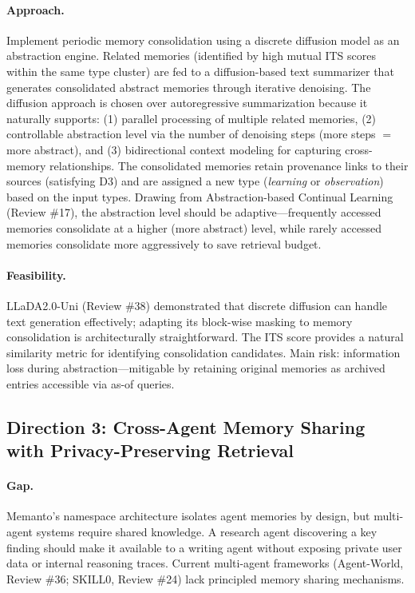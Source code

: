 \documentclass[11pt]{article}
\begin{document}
\paragraph{Approach.}
Implement periodic memory consolidation using a discrete diffusion model as an abstraction engine. Related memories (identified by high mutual ITS scores within the same type cluster) are fed to a diffusion-based text summarizer that generates consolidated abstract memories through iterative denoising. The diffusion approach is chosen over autoregressive summarization because it naturally supports: (1) parallel processing of multiple related memories, (2) controllable abstraction level via the number of denoising steps (more steps $=$ more abstract), and (3) bidirectional context modeling for capturing cross-memory relationships. The consolidated memories retain provenance links to their sources (satisfying D3) and are assigned a new type (\emph{learning} or \emph{observation}) based on the input types. Drawing from Abstraction-based Continual Learning (Review \#17), the abstraction level should be adaptive---frequently accessed memories consolidate at a higher (more abstract) level, while rarely accessed memories consolidate more aggressively to save retrieval budget.

\paragraph{Feasibility.}
LLaDA2.0-Uni (Review \#38) demonstrated that discrete diffusion can handle text generation effectively; adapting its block-wise masking to memory consolidation is architecturally straightforward. The ITS score provides a natural similarity metric for identifying consolidation candidates. Main risk: information loss during abstraction---mitigable by retaining original memories as archived entries accessible via as-of queries.

\subsection{Direction 3: Cross-Agent Memory Sharing with Privacy-Preserving Retrieval}

\paragraph{Gap.}
Memanto's namespace architecture isolates agent memories by design, but multi-agent systems require shared knowledge. A research agent discovering a key finding should make it available to a writing agent without exposing private user data or internal reasoning traces. Current multi-agent frameworks (Agent-World, Review \#36; SKILL0, Review \#24) lack principled memory sharing mechanisms.
\end{document}
